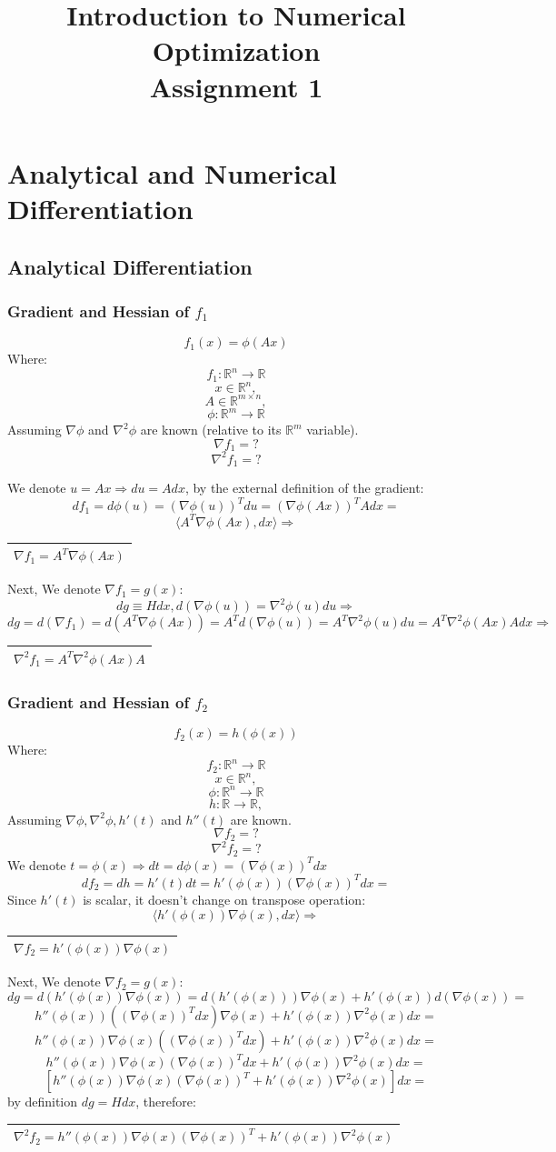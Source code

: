 \documentclass[12pt]{article}
\title{Introduction to Numerical Optimization\\Assignment 1}
\newcommand{\rectres}[1]{
\begin{center}
\begin{tabular}{ |c| }
\hline
 #1\\
\hline
\end{tabular}
\end{center}
}
\begin{document}
\maketitle


\section{Analytical and Numerical Differentiation}

\subsection{Analytical Differentiation}

\subsubsection{Gradient and Hessian of $f_1$}
$$f_1(x)=\phi(Ax)$$
Where:
$$f_1:\mathbb{R}^n \rightarrow \mathbb{R}$$
$$x \in \mathbb{R}^{n},$$
$$A \in \mathbb{R}^{m\times n},$$
$$\phi:\mathbb{R}^m \rightarrow \mathbb{R}$$
Assuming $\nabla\phi$ and $\nabla^2\phi$ are known (relative to its $\mathbb{R}^m$ variable).
$$\nabla f_1 = ?$$
$$\nabla^2 f_1 = ?$$

We denote $u=Ax \Rightarrow du=Adx$, by the external definition of the gradient:
$$df_1=d\phi(u)=(\nabla\phi(u))^T du = (\nabla\phi(Ax))^T A dx = $$
$$ \langle A^T\nabla \phi(Ax), dx \rangle \Rightarrow $$
\rectres{$\nabla f_1 = A^T\nabla \phi(Ax)$}
Next, We denote $\nabla f_1= g(x)$:
$$dg\equiv Hdx,d(\nabla \phi(u)) =  \nabla^2 \phi(u) du \Rightarrow$$
$$dg=d(\nabla f_1) = d(A^T\nabla \phi(Ax))=A^Td(\nabla \phi(u))=A^T\nabla^2 \phi(u) du = A^T\nabla^2 \phi(Ax) A dx \Rightarrow$$
\rectres{$\nabla^2 f_1 = A^T\nabla^2 \phi(Ax) A$}

\subsubsection{Gradient and Hessian of $f_2$}
$$f_2(x)=h(\phi(x))$$
Where:
$$f_2:\mathbb{R}^n \rightarrow \mathbb{R}$$
$$x \in \mathbb{R}^{n},$$
$$\phi:\mathbb{R}^n \rightarrow \mathbb{R}$$
$$h:\mathbb{R} \rightarrow \mathbb{R},$$
Assuming $\nabla\phi, \nabla^2\phi, h'(t)$ and $h''(t)$ are known.
$$\nabla f_2 = ?$$
$$\nabla^2 f_2 = ?$$
We denote $t=\phi(x)\Rightarrow dt=d\phi(x)=(\nabla \phi(x))^Tdx$
$$df_2= dh = h'(t)dt = h'(\phi(x))(\nabla \phi(x))^Tdx=$$
Since $h'(t)$ is scalar, it doesn't change on transpose operation:
$$\langle h'(\phi(x))\nabla \phi(x), dx \rangle \Rightarrow$$
\rectres{$\nabla f_2 = h'(\phi(x))\nabla \phi(x)$}
Next, We denote $\nabla f_2= g(x)$:
$$dg = d(h'(\phi(x))\nabla \phi(x)) =  d(h'(\phi(x)))\nabla \phi(x) + h'(\phi(x))d(\nabla \phi(x))=$$
$$h''(\phi(x))((\nabla \phi(x))^Tdx)\nabla \phi(x) + h'(\phi(x))\nabla^2 \phi(x)dx=$$
$$h''(\phi(x))\nabla \phi(x)((\nabla \phi(x))^Tdx) + h'(\phi(x))\nabla^2 \phi(x)dx=$$
$$h''(\phi(x))\nabla \phi(x)(\nabla \phi(x))^Tdx + h'(\phi(x))\nabla^2 \phi(x)dx=$$
$$[h''(\phi(x))\nabla \phi(x)(\nabla \phi(x))^T + h'(\phi(x))\nabla^2 \phi(x)]dx=$$
by definition $dg=Hdx$, therefore:
\rectres{$\nabla^2 f_2 = h''(\phi(x))\nabla \phi(x)(\nabla \phi(x))^T + h'(\phi(x))\nabla^2 \phi(x)$}
\newpage
\end{document}
